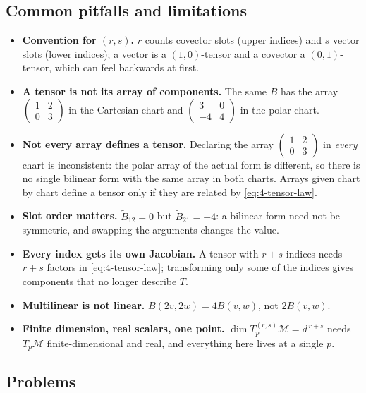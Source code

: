 \documentclass[11pt]{article}
\newcommand{\TpM}{T_p\mathcal M}
\newcommand{\TprsM}{T_p^{(r,s)}\mathcal M}
\begin{document}
\subsection*{Common pitfalls and limitations}

\begin{itemize}
  \item \textbf{Convention for $(r,s)$.} $r$ counts covector slots (upper indices) and $s$ vector slots (lower indices); a vector is a $(1,0)$-tensor and a covector a $(0,1)$-tensor, which can feel backwards at first.
  \item \textbf{A tensor is not its array of components.} The same $B$ has the array $\begin{pmatrix}1&2\\0&3\end{pmatrix}$ in the Cartesian chart and $\begin{pmatrix}3&0\\-4&4\end{pmatrix}$ in the polar chart.
  \item \textbf{Not every array defines a tensor.} Declaring the array $\begin{pmatrix}1&2\\0&3\end{pmatrix}$ in \emph{every} chart is inconsistent: the polar array of the actual form is different, so there is no single bilinear form with the same array in both charts. Arrays given chart by chart define a tensor only if they are related by \eqref{eq:4-tensor-law}.
  \item \textbf{Slot order matters.} $\widetilde B_{12}=0$ but $\widetilde B_{21}=-4$: a bilinear form need not be symmetric, and swapping the arguments changes the value.
  \item \textbf{Every index gets its own Jacobian.} A tensor with $r+s$ indices needs $r+s$ factors in \eqref{eq:4-tensor-law}; transforming only some of the indices gives components that no longer describe $T$.
  \item \textbf{Multilinear is not linear.} $B(2v,2w)=4B(v,w)$, not $2B(v,w)$.
  \item \textbf{Finite dimension, real scalars, one point.} $\dim\TprsM=d^{\,r+s}$ needs $\TpM$ finite-dimensional and real, and everything here lives at a single $p$.
\end{itemize}

\subsection*{Problems}
\end{document}
